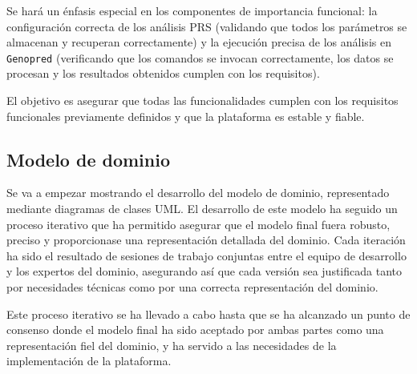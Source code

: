 \begin{enumerate}
    Se hará un énfasis especial en los componentes de importancia funcional: la configuración correcta de los análisis PRS (validando que todos los parámetros se almacenan y recuperan correctamente) y la ejecución precisa de los análisis en \texttt{Genopred} (verificando que los comandos se invocan correctamente, los datos se procesan y los resultados obtenidos cumplen con los requisitos).
    
    El objetivo es asegurar que todas las funcionalidades cumplen con los requisitos funcionales previamente definidos y que la plataforma es estable y fiable. 
\end{enumerate}


\subsection{Modelo de dominio}
Se va a empezar mostrando el desarrollo del modelo de dominio, representado mediante diagramas de clases UML. El desarrollo de este modelo ha seguido un proceso iterativo que ha permitido asegurar que el modelo final fuera robusto, preciso y proporcionase una representación detallada del dominio. Cada iteración ha sido el resultado de sesiones de trabajo conjuntas entre el equipo de desarrollo y los expertos del dominio, asegurando así que cada versión sea justificada tanto por necesidades técnicas como por una correcta representación del dominio.

Este proceso iterativo se ha llevado a cabo hasta que se ha alcanzado un punto de consenso donde el modelo final ha sido aceptado por ambas partes como una representación fiel del dominio, y ha servido a las necesidades de la implementación de la plataforma.

